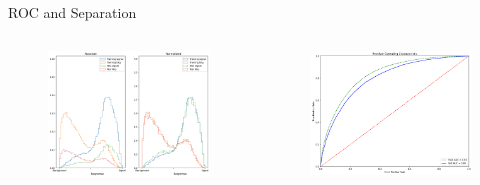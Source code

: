\begin{frame}{ROC and Separation}
    \begin{columns}
        \begin{column}{0.5\textwidth}
            \begin{figure}
                \centering
                \includegraphics[width = \textwidth]{evo_response.png}
            \end{figure}
        \end{column}
        \begin{column}{0.5\textwidth}
            \begin{figure}
                \centering
                \includegraphics[width = \textwidth]{evo_ROC.png}
            \end{figure}
        \end{column}
    \end{columns}
\end{frame}

